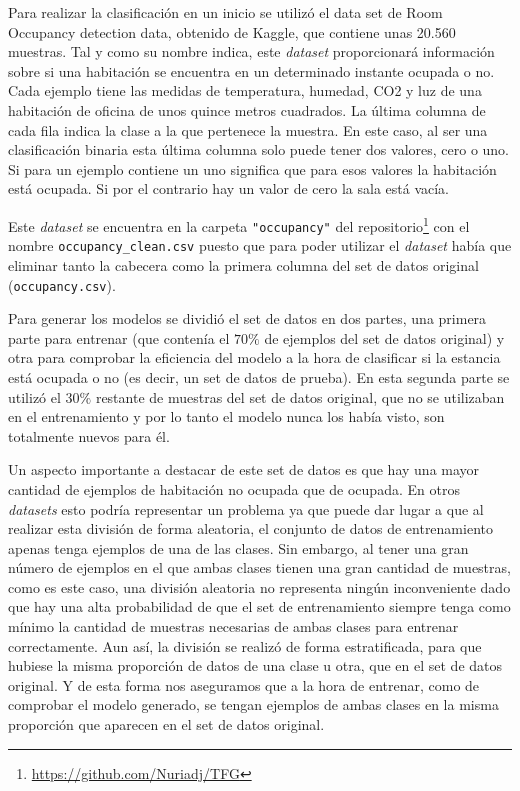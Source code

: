\documentclass[a4paper, 12pt]{book}
\begin{document}
Para realizar la clasificación en un inicio se utilizó el data set de Room Occupancy detection data\cite{DataSetOccupancy}, obtenido de Kaggle, que contiene unas 20.560 muestras. Tal y como su nombre indica, este \textit{dataset} proporcionará información sobre si una habitación se encuentra en un determinado instante ocupada o no. Cada ejemplo tiene las medidas de temperatura, humedad, CO2 y luz de una habitación de oficina de unos quince metros cuadrados. La última columna de cada fila indica la clase a la que pertenece la muestra. En este caso, al ser una clasificación binaria esta última columna solo puede tener dos valores, cero o uno. Si para un ejemplo contiene un uno significa que para esos valores la habitación está ocupada. Si por el contrario hay un valor de cero la sala está vacía. 

Este \textit{dataset} se encuentra en la carpeta \texttt{"occupancy"} del repositorio\footnote{\url{https://github.com/Nuriadj/TFG}} con el nombre \texttt{occupancy\_clean.csv} puesto que para poder utilizar el \textit{dataset} había que eliminar tanto la cabecera como la primera columna del set de datos original (\texttt{occupancy.csv}).


Para generar los modelos se dividió el set de datos en dos partes, una primera parte para entrenar (que contenía el $70\%$ de ejemplos del set de datos original) y otra para comprobar la eficiencia del modelo a la hora de clasificar si la estancia está ocupada o no (es decir, un set de datos de prueba). En esta segunda parte se utilizó el $30\%$ restante de muestras del set de datos original, que no se utilizaban en el entrenamiento y por lo tanto el modelo nunca los había visto, son totalmente nuevos para él.

Un aspecto importante a destacar de este set de datos es que hay una mayor cantidad de ejemplos de habitación no ocupada que de ocupada. En otros \textit{datasets} esto podría representar un problema ya que puede dar lugar a que al realizar esta división de forma aleatoria, el conjunto de datos de entrenamiento apenas tenga ejemplos de una de las clases. Sin embargo, al tener una gran número de ejemplos en el que ambas clases tienen una gran cantidad de muestras, como es este caso, una división aleatoria no representa ningún inconveniente dado que hay una alta probabilidad de que el set de entrenamiento siempre tenga como mínimo la cantidad de muestras necesarias de ambas clases para entrenar correctamente. Aun así, la división se realizó de forma estratificada, para que hubiese la misma proporción de datos de una clase u otra, que en el set de datos original. Y de esta forma nos aseguramos que a la hora de entrenar, como de comprobar el modelo generado, se tengan ejemplos de ambas clases en la misma proporción que aparecen en el set de datos original.
\end{document}
